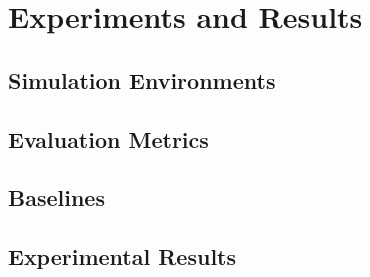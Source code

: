 \chapter{Experiments and Results}
\label{text:experiments}

\section{Simulation Environments}
\label{text:experiments/environments}

\section{Evaluation Metrics}
\label{text:experiments/metrics}

\section{Baselines}
\label{text:experiments/baselines}

\section{Experimental Results}
\label{text:experiments/results}